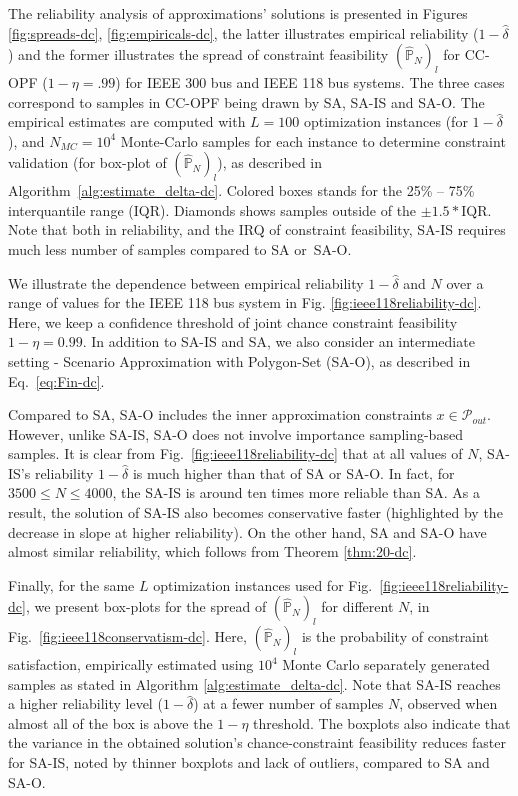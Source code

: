 The reliability analysis of approximations' solutions is presented in Figures \ref{fig:spreads-dc}, \ref{fig:empiricals-dc}, the latter illustrates empirical reliability ($1-\hat{\delta}$) and the former illustrates the spread of constraint feasibility $(\hat{\mathbb{P}}_N)_l$ for CC-OPF ($1-\eta =.99$) for IEEE 300 bus and IEEE 118 bus systems. The three cases correspond to samples in CC-OPF being drawn by SA, SA-IS and SA-O. The empirical estimates are computed with $L = 100$ optimization instances (for $1-\hat{\delta}$), and $N_{MC}=10^4$ Monte-Carlo samples for each instance to determine constraint validation (for box-plot of $(\hat{\mathbb{P}}_N)_l$), as described in Algorithm~\ref{alg:estimate_delta-dc}. 
Colored boxes stands for the 25\% -- 75\% interquantile range (IQR). Diamonds shows samples outside of the $\pm 1.5*\text{IQR}$. 
Note that both in reliability, and the IRQ of constraint feasibility, SA-IS requires much less number of samples compared to SA or~SA-O.

We illustrate the dependence between empirical reliability $1-\hat{\delta}$ and $N$ over a range of values for the IEEE 118 bus system in Fig. \ref{fig:ieee118reliability-dc}. Here, we keep a confidence threshold of joint chance constraint feasibility $1-\eta =0.99$. In addition to SA-IS and SA, we also consider an intermediate setting - Scenario Approximation with Polygon-Set (SA-O), as described in Eq.~\eqref{eq:Fin-dc}. 

Compared to SA, SA-O includes the inner approximation constraints $x \in \mathcal{P}_{out}$. However, unlike SA-IS, SA-O does not involve importance sampling-based samples. It is clear from Fig.~\ref{fig:ieee118reliability-dc} that at all values of $N$, SA-IS's reliability $1-\hat{\delta}$ is much higher than that of SA or SA-O. In fact, for $3500\leq N \leq 4000$, the SA-IS is around ten times more reliable than SA. As a result, the solution of SA-IS also becomes conservative faster (highlighted by the decrease in slope at higher reliability). On the other hand, SA and SA-O have almost similar reliability, which follows from Theorem \ref{thm:20-dc}. 

Finally, for the same $L$ optimization instances used for Fig.~\ref{fig:ieee118reliability-dc}, we present box-plots for the spread of $(\hat{\mathbb{P}}_N)_l$ for different $N$, in Fig.~\ref{fig:ieee118conservatism-dc}. Here, $(\hat{\mathbb{P}}_N)_l$ is the probability of constraint satisfaction, empirically estimated using $10^4$ Monte Carlo separately generated samples as stated in Algorithm \ref{alg:estimate_delta-dc}. Note that SA-IS reaches a higher reliability level ($1-\hat{\delta}$) at a fewer number of samples $N$, observed when almost all of the box is above the $1-\eta$ threshold. The boxplots also indicate that the variance in the obtained solution's chance-constraint feasibility reduces faster for SA-IS, noted by thinner boxplots and lack of outliers, compared to SA and SA-O.

